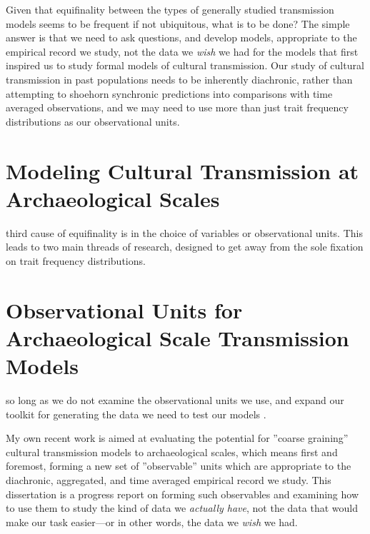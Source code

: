 Given that equifinality between the types of generally studied transmission models seems to be frequent if not ubiquitous, what is to be done?  The simple answer is that we need to ask questions, and develop models, appropriate to the empirical record we study, not the data we \emph{wish} we had for the models that first inspired us to study formal models of cultural transmission.  Our study of cultural transmission in past populations needs to be inherently diachronic, rather than attempting to shoehorn synchronic predictions into comparisons with time averaged observations, and we may need to use more than just trait frequency distributions as our observational units.

\section{Modeling Cultural Transmission at Archaeological Scales}
\label{sec:modeling-archy-scales}





third cause of equifinality is in the choice of variables or observational units.  This leads to two main threads of research, designed to get away from the sole fixation on trait frequency distributions.  

\section{Observational Units for Archaeological Scale Transmission Models}
\label{sec:observational-units}






so long as we do not examine the observational units we use, and expand our toolkit for generating the data we need to test our models \citep{tostevin2019content}.  



My own recent work is aimed at evaluating the potential for ''coarse graining'' cultural transmission models to archaeological scales, which means first and foremost, forming a new set of ''observable'' units which are appropriate to the diachronic, aggregated, and time averaged empirical record we study.  This dissertation is a progress report on forming such observables and examining how to use them to study the kind of data we \emph{actually have}, not the data that would make our task easier---or in other words, the data we \emph{wish} we had. 







